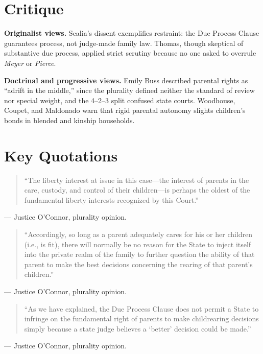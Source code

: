 \documentclass[12pt]{article}
\begin{document}
\section{Critique}

\textbf{Originalist views.} Scalia's dissent exemplifies restraint: the Due Process Clause guarantees process, not judge-made family law. Thomas, though skeptical of substantive due process, applied strict scrutiny because no one asked to overrule \textit{Meyer} or \textit{Pierce}.

\textbf{Doctrinal and progressive views.} Emily Buss described parental rights as ``adrift in the middle,'' since the plurality defined neither the standard of review nor special weight, and the 4--2--3 split confused state courts. Woodhouse, Coupet, and Maldonado warn that rigid parental autonomy slights children's bonds in blended and kinship households.

\section{Key Quotations}

\begin{quote}
``The liberty interest at issue in this case---the interest of parents in the care, custody, and control of their children---is perhaps the oldest of the fundamental liberty interests recognized by this Court.''
\end{quote}
\noindent --- Justice O'Connor, plurality opinion.

\begin{quote}
``Accordingly, so long as a parent adequately cares for his or her children (i.e., is fit), there will normally be no reason for the State to inject itself into the private realm of the family to further question the ability of that parent to make the best decisions concerning the rearing of that parent's children.''
\end{quote}
\noindent --- Justice O'Connor, plurality opinion.

\begin{quote}
``As we have explained, the Due Process Clause does not permit a State to infringe on the fundamental right of parents to make childrearing decisions simply because a state judge believes a `better' decision could be made.''
\end{quote}
\noindent --- Justice O'Connor, plurality opinion.
\end{document}
